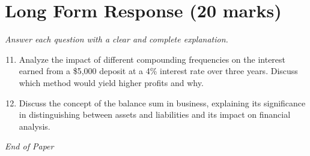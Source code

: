 \documentclass[12pt]{article}
\begin{document}
\section*{Long Form Response (20 marks)}
\textit{Answer each question with a clear and complete explanation.}
\begin{enumerate}[label=\arabic*.]
\setcounter{enumi}{10}
\item Analyze the impact of different compounding frequencies on the interest earned from a \$5,000 deposit at a 4\% interest rate over three years. Discuss which method would yield higher profits and why.
\item Discuss the concept of the balance sum in business, explaining its significance in distinguishing between assets and liabilities and its impact on financial analysis.
\end{enumerate}

\vfill
\noindent\textit{End of Paper}
\end{document}
